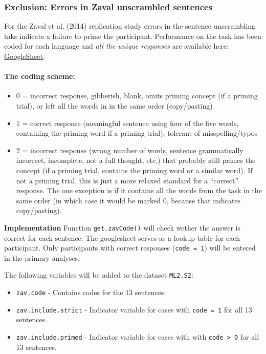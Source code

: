 \documentclass[]{article}
\begin{document}
\subsubsection{\textbf{Exclusion:} Errors in Zaval unscrambled
sentences}\label{exclusion-errors-in-zaval-unscrambled-sentences}

For the Zaval et al. (2014) replication study errors in the sentence
unscrambling taks indicate a failure to prime the participant.
Performance on the task has been coded for each language and \emph{all
the unique responses} are available here:
\href{https://docs.google.com/spreadsheets/d/1aJJcCk8UvefbSAIePhmh6kEolOc5RwwB3cC_hBtrH5c/edit?usp=sharing}{GoogleSheet}.

\paragraph{The coding scheme:}\label{the-coding-scheme}

\begin{itemize}
\itemsep1pt\parskip0pt
\item
  0 = incorrect response, gibberish, blank, omits priming concept (if a
  priming trial), or left all the words in in the same order
  (copy/pasting)
\item
  1 = correct response (meaningful sentence using four of the five
  words, containing the priming word if a priming trial), tolerant of
  misspelling/typos
\item
  2 = incorrect response (wrong number of words, sentence grammatically
  incorrect, incomplete, not a full thought, etc.) that probably still
  primes the concept (if a priming trial, contains the priming word or a
  similar word). If not a priming trial, this is just a more relaxed
  standard for a ``correct'' response. The one exception is if it
  contains all the words from the task in the same order (in which case
  it would be marked 0, because that indicates copy/pasting).
\end{itemize}

\textbf{Implementation} Function \texttt{get.zavCode()} will check
wether the answer is correct for each sentence. The googlesheet serves
as a lookup table for each participant. Only participants with correct
responses (\texttt{code = 1}) will be entered in the primary analyses.

The following variables will be added to the dataset \texttt{ML2.S2}:

\begin{itemize}
\itemsep1pt\parskip0pt
\item
  \texttt{zav.code} - Contains codes for the 13 sentences.
\item
  \texttt{zav.include.strict} - Indicator variable for cases with
  \texttt{code = 1} for all 13 sentences.
\item
  \texttt{zav.include.primed} - Indicator variable for cases with with
  \texttt{code \textgreater{} 0} for all 13 sentences.
\end{itemize}
\end{document}
